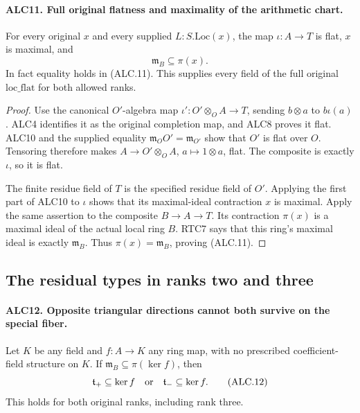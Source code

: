 \documentclass[11pt,a4paper]{article}
\numberwithin{equation}{section}
\theoremstyle{remark}\newtheorem{remark}[theorem]{Remark}
\begin{document}
\paragraph{ALC11. Full original flatness and maximality of the arithmetic chart.}
\label{claim:ALC11}
For every original \(x\) and every supplied
\(L:S.\mathrm{Loc}(x)\), the map \(\iota:A\to T\) is
flat, \(x\) is maximal, and
\[
                    \mathfrak m_B\subseteq\pi(x).
                                                        \tag{ALC.11}
\]
In fact equality holds in (ALC.11).  This supplies every
field of the full original \(\mathrm{loc\_\allowbreak flat}\) for
both allowed ranks.

\begin{proof}
Use the canonical \(O'\)-algebra map
\(\iota':O'\otimes_OA\to T\), sending
\(b\otimes a\) to \(b\iota(a)\).  ALC4 identifies it
as the original completion map, and ALC8 proves it flat.
ALC10 and the supplied equality
\(\mathfrak m_OO'=\mathfrak m_{O'}\) show that \(O'\)
is flat over \(O\).  Tensoring therefore makes
\(A\to O'\otimes_OA\), \(a\mapsto1\otimes a\),
flat.  The composite is exactly \(\iota\), so it is flat.

The finite residue field of \(T\) is the specified residue
field of \(O'\).  Applying the first part of ALC10 to
\(\iota\) shows that its maximal-ideal contraction \(x\)
is maximal.  Apply the same assertion to the composite
\(B\to A\to T\).  Its contraction \(\pi(x)\) is a
maximal ideal of the actual local ring \(B\).  RTC7 says
that this ring's maximal ideal is exactly \(\mathfrak m_B\).
Thus \(\pi(x)=\mathfrak m_B\), proving (ALC.11).
\end{proof}

\subsection{The residual types in ranks two and three}

\paragraph{ALC12. Opposite triangular directions cannot both survive on the special fiber.}
\label{claim:ALC12}
Let \(K\) be any field and \(f:A\to K\) any ring map,
with no prescribed coefficient-field structure on \(K\).
If \(\mathfrak m_B\subseteq\pi(\ker f)\), then
\[
             \mathfrak t_+\subseteq\ker f
             \quad\hbox{or}\quad
             \mathfrak t_-\subseteq\ker f.
                                                        \tag{ALC.12}
\]
This holds for both original ranks, including rank three.
\end{document}

